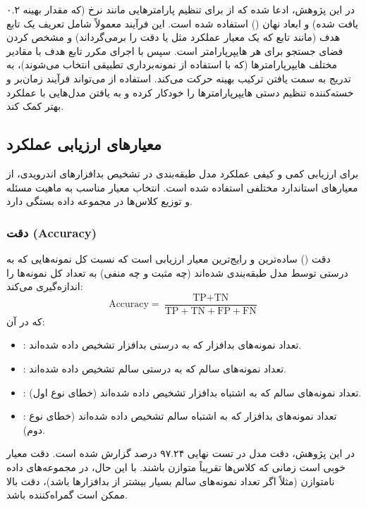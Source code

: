 در این پژوهش، ادعا شده که از  برای تنظیم پارامترهایی مانند نرخ  (که مقدار بهینه ۰.۲ یافت شده) و ابعاد نهان () استفاده شده است. این فرآیند معمولاً شامل تعریف یک تابع هدف (مانند تابع  که یک معیار عملکرد مثل  یا دقت را برمی‌گرداند) و مشخص کردن فضای جستجو برای هر هایپرپارامتر است. سپس  با اجرای مکرر تابع هدف با مقادیر مختلف هایپرپارامترها (که با استفاده از نمونه‌برداری تطبیقی انتخاب می‌شوند)، به تدریج به سمت یافتن ترکیب بهینه حرکت می‌کند. استفاده از  می‌تواند فرآیند زمان‌بر و خسته‌کننده تنظیم دستی هایپرپارامترها را خودکار کرده و به یافتن مدل‌هایی با عملکرد بهتر کمک کند.

\subsection{معیارهای ارزیابی عملکرد}
برای ارزیابی کمی و کیفی عملکرد مدل طبقه‌بندی  در تشخیص بدافزارهای اندرویدی، از معیارهای استاندارد مختلفی استفاده شده است. انتخاب معیار مناسب به ماهیت مسئله و توزیع کلاس‌ها در مجموعه داده بستگی دارد.

\subsubsection{دقت (Accuracy)}
دقت () ساده‌ترین و رایج‌ترین معیار ارزیابی است که نسبت کل نمونه‌هایی که به درستی توسط مدل طبقه‌بندی شده‌اند (چه مثبت و چه منفی) به تعداد کل نمونه‌ها را اندازه‌گیری می‌کند:
\[ \text{Accuracy} = \frac{\text{TP} + \text{TN}}{\text{TP} + \text{TN} + \text{FP} + \text{FN}} \]
که در آن:
\begin{itemize}
    \item {}: تعداد نمونه‌های بدافزار که به درستی بدافزار تشخیص داده شده‌اند.
    \item {}: تعداد نمونه‌های سالم که به درستی سالم تشخیص داده شده‌اند.
    \item {}: تعداد نمونه‌های سالم که به اشتباه بدافزار تشخیص داده شده‌اند (خطای نوع اول).
    \item {}: تعداد نمونه‌های بدافزار که به اشتباه سالم تشخیص داده شده‌اند (خطای نوع دوم).
\end{itemize}
در این پژوهش، دقت مدل  در تست نهایی ۹۷.۲۴ درصد گزارش شده است. دقت معیار خوبی است زمانی که کلاس‌ها تقریباً متوازن باشند. با این حال، در مجموعه‌های داده نامتوازن (مثلاً اگر تعداد نمونه‌های سالم بسیار بیشتر از بدافزارها باشد)، دقت بالا ممکن است گمراه‌کننده باشد.

